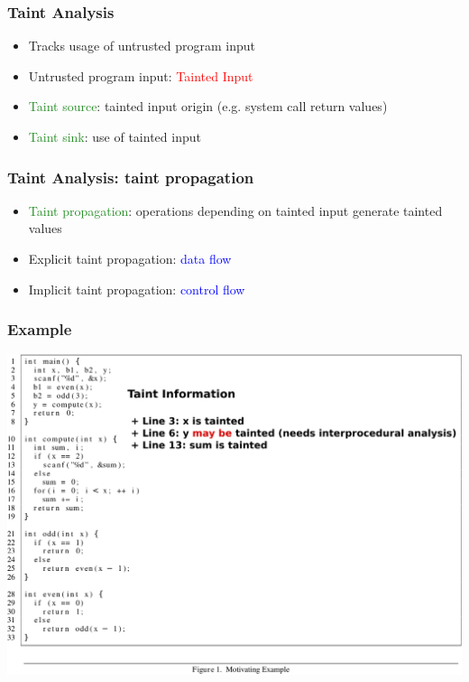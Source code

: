 \documentclass[xcolor=dvipsnames]{beamer}
\begin{document}
\begin{frame}
  \frametitle{Taint Analysis} {\large
   \begin{itemize}
	\item Tracks usage of untrusted program input
   	\vspace{0.5cm}	   
	\item Untrusted program input: \textcolor{red}{Tainted Input}
   	\vspace{0.5cm}	
	\item \textcolor{forestgreen}{Taint source}: tainted input origin (e.g. system call return values)
   	\vspace{0.5cm}
	\item \textcolor{forestgreen}{Taint sink}: use of tainted input
	\end{itemize}
	}
\end{frame}

\begin{frame}
  \frametitle{Taint Analysis: taint propagation} {\large
   \begin{itemize}
   	\item \textcolor{forestgreen}{Taint propagation}: operations depending on tainted input generate tainted values
   	\vspace{0.5cm}	   	
   	\item Explicit taint propagation: \textcolor{blue}{data flow}
   	\vspace{0.5cm}	
	\item Implicit taint propagation: \textcolor{blue}{control flow}   	
	\end{itemize}
	}
\end{frame}


\begin{frame}
  \frametitle{Example} 
    {\small
    \begin{center}
	\includegraphics[scale=0.6]{example-explained}   	
	\end{center}   
	}
\end{frame}
\end{document}

